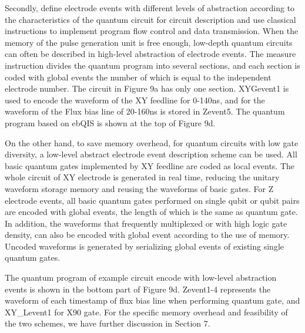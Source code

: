 Secondly, define electrode events with different levels of abstraction according to the characteristics of the quantum circuit for circuit description and use classical instructions to implement program flow control and data transmission. 
When the memory of the pulse generation unit is free enough, low-depth quantum circuits can often be described in high-level abstraction of electrode events. 
The measure instruction divides the quantum program into several sections, and each section is coded with global events the number of which is equal to the independent electrode number. 
The circuit in Figure 9a has only one section. XYGevent1 is used to encode the waveform of the XY feedline for 0-140ns, and for the waveform of the Flux bias line of 20-160ns is stored in Zevent5. 
The quantum program based on ebQIS is shown at the top of Figure 9d.

On the other hand, to save memory overhead, for quantum circuits with low gate diversity, a low-level abstract electrode event description scheme can be used. 
All basic quantum gates implemented by XY feedline are coded as local events. The whole circuit of XY electrode is generated in real time, 
reducing the unitary waveform storage memory and reusing the waveforms of basic gates. For Z electrode events, 
all basic quantum gates performed on single qubit or qubit pairs are encoded with global events, the length of which is the same as quantum gate. 
In addition, the waveforms that frequently multiplexed or with high logic gate density, can also be encoded with global event according to the use of memory. 
Uncoded waveforms is generated by serializing global events of existing single quantum gates.    

The quantum program of example circuit encode with low-level abstraction events is shown in the bottom part of Figure 9d. 
Zevent1-4 represents the waveform of each timestamp of flux bias line when performing quantum gate, 
and XY\_Levent1 for X90 gate. For the specific memory overhead and feasibility of the two schemes, 
we have further discussion in Section 7.


